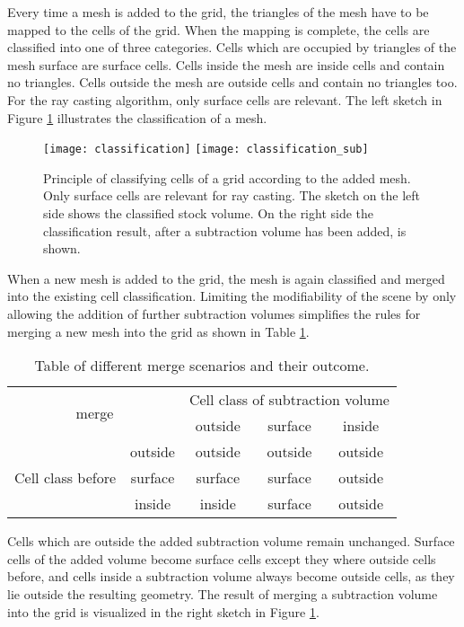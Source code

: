Every time a mesh is added to the grid, the triangles of the mesh have to be mapped to the cells of the grid. When the mapping is complete, the cells are classified into one of three categories. Cells which are occupied by triangles of the mesh surface are surface cells. Cells inside the mesh are inside cells and contain no triangles. Cells outside the mesh are outside cells and contain no triangles too. For the ray casting algorithm, only surface cells are relevant. The left sketch in Figure \ref{fig:classification} illustrates the classification of a mesh.

\begin{figure}
\centering
\texttt{[image: classification]}
\texttt{[image: classification\_sub]}
\caption{Principle of classifying cells of a grid according to the added mesh. Only surface cells are relevant for ray casting. The sketch on the left side shows the classified stock volume. On the right side the classification result, after a subtraction volume has been added, is shown.}
\label{fig:classification}
\end{figure}

When a new mesh is added to the grid, the mesh is again classified and merged into the existing cell classification. Limiting the modifiability of the scene by only allowing the addition of further subtraction volumes simplifies the rules for merging a new mesh into the grid as shown in Table \ref{tbl:classification_rules}.

\begin{table}[h]
\centering
\begin{tabular}{|c|c|c|c|c|}
\hline
\multicolumn{2}{|c|}{\multirow{2}{*}{merge}} & \multicolumn{3}{c|}{Cell class of subtraction volume} \\
\cline{3-5}
\multicolumn{2}{|c|}{} & outside & surface & inside \\
 \hline
\multirow{3}{*}{Cell class before} & outside & outside & outside & outside \\
\cline{2-5}
 & surface & surface & surface & outside \\
\cline{2-5}
 & inside & inside & surface & outside \\
\hline
\end{tabular}
\caption{Table of different merge scenarios and their outcome.}
\label{tbl:classification_rules}
\end{table}

Cells which are outside the added subtraction volume remain unchanged. Surface cells of the added volume become surface cells except they where outside cells before, and cells inside a subtraction volume always become outside cells, as they lie outside the resulting geometry. The result of merging a subtraction volume into the grid is visualized in the right sketch in Figure \ref{fig:classification}.

